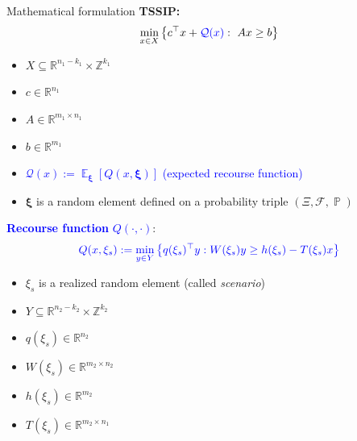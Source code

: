 \documentclass[usenames,dvipsnames]{beamer}
\DeclareMathOperator*{\PP}{\mathbb{P}}
\DeclareMathOperator*{\EE}{\mathbb{E}}
\begin{document}
\begin{frame}[shrink=15]{Mathematical formulation}
\textbf{TSSIP:}
\begin{align}
\min_{x\in X}{\left\{c^\top x + \textcolor{blue}{\mathcal{Q}(x)}:\ Ax\ge b\right\}} \label{eq:SIP_1}
\end{align}
\vspace{-0.4cm}
\begin{itemize}
\item $X\subseteq \mathbb{R}^{n_1-k_1}\times\mathbb{Z}^{k_1}$
\item $c\in\mathbb{R}^{n_1}$
\item $A\in\mathbb{R}^{m_1\times n_1}$
\item $b\in\mathbb{R}^{m_1}$
\item \textcolor{blue}{$\mathcal{Q}(x):=\EE_{\pmb{\xi}}[Q(x,\pmb{\xi})]$ (expected recourse function)}
\item $\pmb{\xi}$ is a random element defined on a probability triple $(\Xi, \mathcal{F},\PP)$
\end{itemize}
\vspace{0.4cm}
\textbf{\textcolor{blue}{Recourse function}} \textcolor{blue}{$Q(\cdot,\cdot)$}:
\begin{align}
\textcolor{blue}{Q(x,\xi_s):=\min_{y\in Y}\left\{q(\xi_s)^\top y : W(\xi_s)y\ge h(\xi_s)-T(\xi_s)x\right\}}
\end{align}
\vspace{-0.4cm}
\begin{itemize}
\item $\xi_s$ is a realized random element (called \textit{scenario})
\item $Y\subseteq\mathbb{R}^{n_2-k_2}\times\mathbb{Z}^{k_2}$
\item $q(\xi_s)\in\mathbb{R}^{n_2}$
\item $W(\xi_s)\in\mathbb{R}^{m_2\times n_2}$
\item $h(\xi_s)\in\mathbb{R}^{m_2}$
\item $T(\xi_s)\in\mathbb{R}^{m_2\times n_1}$
\end{itemize}		
\end{frame}
\end{document}
